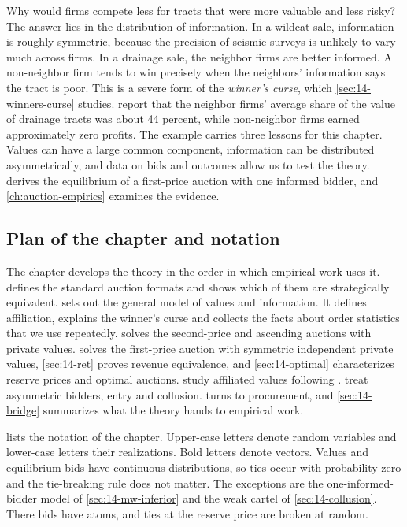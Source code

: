 Why would firms compete less for tracts that were more valuable and less risky? The answer lies in the
distribution of information. In a wildcat sale, information is roughly symmetric, because the precision of
seismic surveys is unlikely to vary much across firms. In a drainage sale, the neighbor firms are better
informed. A non-neighbor firm tends to win precisely when the neighbors' information says the tract is
poor. This is a severe form of the \emph{winner's curse}, which \cref{sec:14-winners-curse} studies.
\citet[p.~866]{HendricksPorter1988} report that the neighbor firms' average share of the value of drainage
tracts was about 44 percent, while non-neighbor firms earned approximately zero profits. The example
carries three lessons for this chapter. Values can have a large common component, information can be
distributed asymmetrically, and data on bids and outcomes allow us to test the theory.
 derives the equilibrium of a first-price auction with one informed bidder, and
\cref{ch:auction-empirics} examines the evidence.

\subsection{Plan of the chapter and notation}\label{sec:14-notation}

The chapter develops the theory in the order in which empirical work uses it.  defines
the standard auction formats and shows which of them are strategically equivalent.  sets
out the general model of values and information. It defines affiliation, explains the winner's curse and
collects the facts about order statistics that we use repeatedly.  solves the
second-price and ascending auctions with private values.  solves the first-price auction
with symmetric independent private values, \cref{sec:14-ret} proves revenue equivalence, and
\cref{sec:14-optimal} characterizes reserve prices and optimal auctions. 
study affiliated values following \citet{MilgromWeber1982}. 
treat asymmetric bidders, entry and collusion.  turns to procurement, and
\cref{sec:14-bridge} summarizes what the theory hands to empirical work.

 lists the notation of the chapter. Upper-case letters denote random variables and
lower-case letters their realizations. Bold letters denote vectors. Values and equilibrium bids have
continuous distributions, so ties occur with probability zero and the tie-breaking rule does not matter.
The exceptions are the one-informed-bidder model of \cref{sec:14-mw-inferior} and the weak cartel of
\cref{sec:14-collusion}. There bids have atoms, and ties at the reserve price are broken at random.

